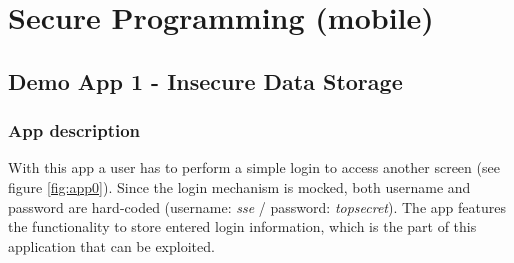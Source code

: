 \section{Secure Programming (mobile)}
\subsection{Demo App 1 - Insecure Data Storage}
\subsubsection{App description}
With this app a user has to perform a simple login to access another screen (see figure \ref{fig:app0}). Since the login mechanism is mocked, both username and password are hard-coded (username: \textit{sse} / password: \textit{topsecret}). The app features the functionality to store entered login information, which is the part of this application that can be exploited.

